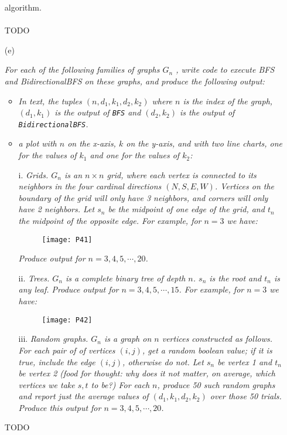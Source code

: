 \documentclass[12pt]{article} \setlength{\oddsidemargin}{0in}
\begin{document}
\begin{enumerate}
{{algorithm.}}
  \\\\
  TODO
  \\
\item[(e)]{\textit{For each of the following families of graphs $G_n$ , write code to execute BFS and BidirectionalBFS on these graphs, and produce the following output:}
    \begin{itemize}
    \item \textit{In text, the tuples $(n, d_1, k_1, d_2, k_2)$ where $n$ is the index of the graph, $(d_1, k_1)$ is the output of \texttt{BFS} and $(d_2, k_2)$ is the output of \texttt{BidirectionalBFS}.}
    \item \textit{a plot with $n$ on the x-axis, $k$ on the y-axis, and with two line charts, one for the values of $k_1$ and one for the values of $k_2$:}
    \end{itemize}
    \begin{enumerate}
    \item[i.] \textit{Grids. $G_n$ is an $n \times n$ grid, where each vertex is connected to its neighbors in the four cardinal directions $(N,S,E,W)$. Vertices on the boundary of the grid
will only have 3 neighbors, and corners will only have 2 neighbors. Let $s_n$
be the midpoint of one edge of the grid, and $t_n$ the midpoint of the opposite
edge. For example, for $n = 3$ we have:}

\begin{figure}[h]
  \centering \texttt{[image: P41]}
\end{figure}

\textit{Produce output for $n = 3, 4, 5, \cdots, 20$.}

\item[ii.] \textit{Trees. $G_n$ is a complete binary tree of depth $n$. $s_n$ is the root and $t_n$ is any leaf. Produce output for $n = 3, 4, 5, \cdots, 15$. For example, for $n = 3$ we have:}

  \begin{figure}[H]
  \centering \texttt{[image: P42]}
  \end{figure}

\item[iii.] \textit{Random graphs. $G_n$ is a graph on $n$ vertices constructed as follows. For each
pair of of vertices $(i, j)$, get a random boolean value; if it is true, include
the edge $(i, j)$, otherwise do not. Let $s_n$ be vertex 1 and $t_n$ be vertex 2 (food
for thought: why does it not matter, on average, which vertices we take $s, t$
to be?) For each $n$, produce 50 such random graphs and report just the
average values of $(d_1, k_ 1, d_2, k_2 )$ over those 50 trials. Produce this output for $n = 3, 4, 5, \cdots, 20$.}
    \end{enumerate}
  }

  TODO

\end{enumerate}



\end{document}
